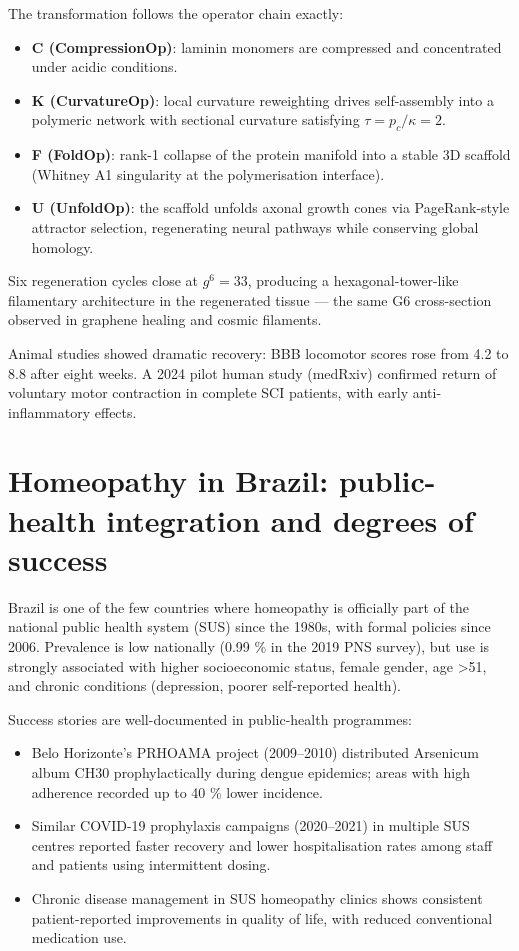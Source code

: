 \documentclass[19pt]{book}
\theoremstyle{plain}
\theoremstyle{definition}
\theoremstyle{remark}
\begin{document}
\begin{enumerate}
The transformation follows the operator chain exactly:

\begin{itemize}
\item \textbf{C (CompressionOp)}: laminin monomers are compressed and concentrated under acidic conditions.
\item \textbf{K (CurvatureOp)}: local curvature reweighting drives self-assembly into a polymeric network with sectional curvature satisfying \(\tau = p_c / \kappa = 2\).
\item \textbf{F (FoldOp)}: rank-1 collapse of the protein manifold into a stable 3D scaffold (Whitney A1 singularity at the polymerisation interface).
\item \textbf{U (UnfoldOp)}: the scaffold unfolds axonal growth cones via PageRank-style attractor selection, regenerating neural pathways while conserving global homology.
\end{itemize}

Six regeneration cycles close at \(g^6 = 33\), producing a hexagonal-tower-like filamentary architecture in the regenerated tissue — the same G6 cross-section observed in graphene healing and cosmic filaments.

Animal studies showed dramatic recovery: BBB locomotor scores rose from 4.2 to 8.8 after eight weeks. A 2024 pilot human study (medRxiv) confirmed return of voluntary motor contraction in complete SCI patients, with early anti-inflammatory effects.

\section{Homeopathy in Brazil: public-health integration and degrees of success}

Brazil is one of the few countries where homeopathy is officially part of the national public health system (SUS) since the 1980s, with formal policies since 2006. Prevalence is low nationally (0.99 \% in the 2019 PNS survey), but use is strongly associated with higher socioeconomic status, female gender, age >51, and chronic conditions (depression, poorer self-reported health). 

Success stories are well-documented in public-health programmes:

\begin{itemize}
\item Belo Horizonte’s PRHOAMA project (2009–2010) distributed Arsenicum album CH30 prophylactically during dengue epidemics; areas with high adherence recorded up to 40 \% lower incidence.
\item Similar COVID-19 prophylaxis campaigns (2020–2021) in multiple SUS centres reported faster recovery and lower hospitalisation rates among staff and patients using intermittent dosing.
\item Chronic disease management in SUS homeopathy clinics shows consistent patient-reported improvements in quality of life, with reduced conventional medication use.
\end{itemize}


\end{enumerate}
\end{document}
